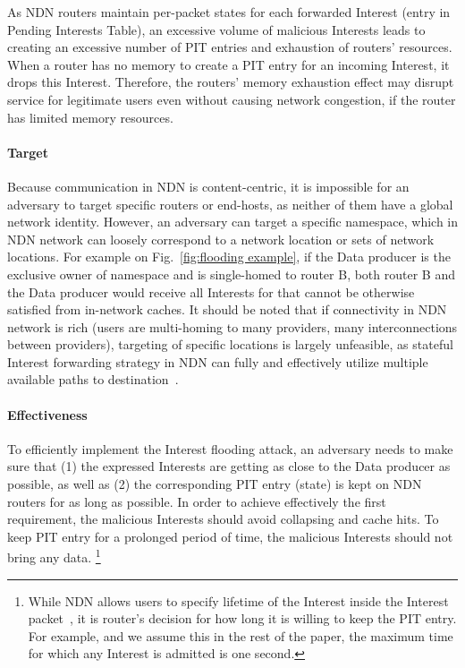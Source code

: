As NDN routers maintain per-packet states for each forwarded Interest (entry in Pending Interests Table), an excessive volume of malicious Interests leads to creating an excessive number of PIT entries and exhaustion of routers' resources.
When a router has no memory to create a PIT entry for an incoming Interest, it drops this Interest.
Therefore, the routers' memory exhaustion effect may disrupt service for legitimate users even without causing network congestion, if the router has limited memory resources.

\paragraph{Target}

Because communication in NDN is content-centric, it is impossible for an adversary to target specific routers or end-hosts, as neither of them have a global network identity.
However, an adversary can target a specific namespace, which in NDN network can loosely correspond to a network location or sets of network locations.
For example on Fig.~\ref{fig:flooding example}, if the Data producer is the exclusive owner of  namespace and is single-homed to router B, both router B and the Data producer would receive all Interests for  that cannot be otherwise satisfied from in-network caches.
It should be noted that if connectivity in NDN network is rich (users are multi-homing to many providers, many interconnections between providers), targeting of specific locations is largely unfeasible, as stateful Interest forwarding strategy in NDN can fully and effectively utilize multiple available paths to destination~\cite{adaptive-forwarding}.


\paragraph{Effectiveness}

To efficiently implement the Interest flooding attack, an adversary needs to make sure that (1) the expressed Interests are getting as close to the Data producer as possible, as well as (2) the corresponding PIT entry (state) is kept on NDN routers for as long as possible.
In order to achieve effectively the first requirement, the malicious Interests should avoid collapsing and cache hits.
To keep PIT entry for a prolonged period of time, the malicious Interests should not bring any data.%
\footnote{While NDN allows users to specify lifetime of the Interest inside the Interest packet~\cite{ndn-conext,ndn-tr}, it is router's decision for how long it is willing to keep the PIT entry.  For example, and we assume this in the rest of the paper, the maximum time for which any Interest is admitted is one second.} 

